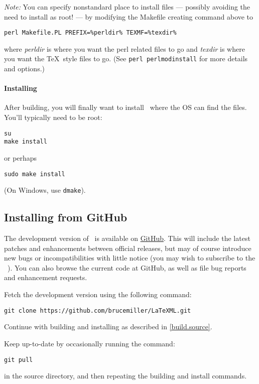 \documentclass{article}
\begin{document}
\emph{Note:} You can specify nonstandard place to install files
--- possibly avoiding the need to install as root! ---
by modifying the Makefile creating command above to
\begin{lstlisting}[style=shell]
perl Makefile.PL PREFIX=%perldir% TEXMF=%texdir%
\end{lstlisting}
where \emph{perldir} is where you want the perl related files to go and
\emph{texdir} is where you want the \TeX\ style files to go.
(See \texttt{perl perlmodinstall} for more details and options.)

\paragraph{Installing}\label{install.source}
After building, you will finally want to install \LaTeXML\ where the OS can find the files.  
You'll typically need to be root:
\begin{lstlisting}[style=shell]
su
make install
\end{lstlisting}
or perhaps
\begin{lstlisting}[style=shell]
sudo make install
\end{lstlisting}
(On Windows, use \texttt{dmake}).

\subsection{Installing from GitHub}\label{install.github}
The development version of \LaTeXML\ is available on  \href{https://github.com}{GitHub}.
This will include the latest patches and enhancements between official releases,
but may of course introduce new bugs or incompatibilities with little notice
(you may wish to subscribe to the \LaTeXML\ ).
You can also browse the current code at GitHub, as well as file bug reports and enhancement requests.

Fetch the development version using the following command:
\begin{lstlisting}[style=shell]
git clone https://github.com/brucemiller/LaTeXML.git
\end{lstlisting}
Continue with building and installing as described in \ref{build.source}.

Keep up-to-date by occasionally running the command:
\begin{lstlisting}[style=shell]
git pull
\end{lstlisting}
in the source directory, and then repeating the building and install commands.
\end{document}
